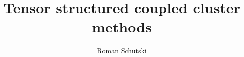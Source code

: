\documentclass[12pt]{ruthesis}
\title{Tensor structured coupled cluster methods}
\author{Roman Schutski}
\begin{document}
  \begin{frontmatter}
   \maketitle
   
   
   \tableofcontents
   \listoffigures
   \listoftables
   
  \end{frontmatter}



%






\appendix

%
%
%
%



\end{document}
